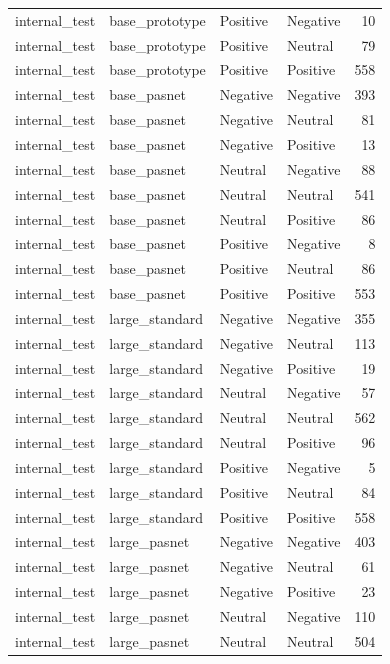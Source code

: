 \begin{tabular}{llllr}
internal\_test & base\_prototype & Positive & Negative & 10 \\
internal\_test & base\_prototype & Positive & Neutral & 79 \\
internal\_test & base\_prototype & Positive & Positive & 558 \\
internal\_test & base\_pasnet & Negative & Negative & 393 \\
internal\_test & base\_pasnet & Negative & Neutral & 81 \\
internal\_test & base\_pasnet & Negative & Positive & 13 \\
internal\_test & base\_pasnet & Neutral & Negative & 88 \\
internal\_test & base\_pasnet & Neutral & Neutral & 541 \\
internal\_test & base\_pasnet & Neutral & Positive & 86 \\
internal\_test & base\_pasnet & Positive & Negative & 8 \\
internal\_test & base\_pasnet & Positive & Neutral & 86 \\
internal\_test & base\_pasnet & Positive & Positive & 553 \\
internal\_test & large\_standard & Negative & Negative & 355 \\
internal\_test & large\_standard & Negative & Neutral & 113 \\
internal\_test & large\_standard & Negative & Positive & 19 \\
internal\_test & large\_standard & Neutral & Negative & 57 \\
internal\_test & large\_standard & Neutral & Neutral & 562 \\
internal\_test & large\_standard & Neutral & Positive & 96 \\
internal\_test & large\_standard & Positive & Negative & 5 \\
internal\_test & large\_standard & Positive & Neutral & 84 \\
internal\_test & large\_standard & Positive & Positive & 558 \\
internal\_test & large\_pasnet & Negative & Negative & 403 \\
internal\_test & large\_pasnet & Negative & Neutral & 61 \\
internal\_test & large\_pasnet & Negative & Positive & 23 \\
internal\_test & large\_pasnet & Neutral & Negative & 110 \\
internal\_test & large\_pasnet & Neutral & Neutral & 504 \\

\end{tabular}
